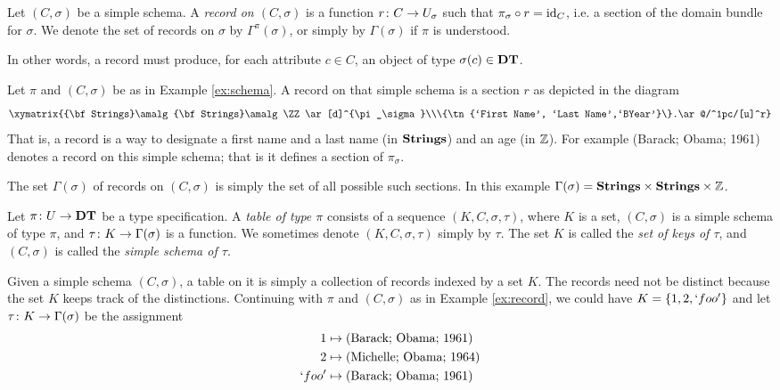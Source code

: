 \documentclass{amsart}
\def\DT{{\bf DT}}
\def\Strings{{\bf Strings}}
\begin{document}
\begin{definition}\label{def:records}

Let $(C,\sigma)$ be a simple schema.  A {\em record on $(C,\sigma)$} is a function $r\colon C\rightarrow U_\sigma$ such that $\pi_\sigma\circ r=\textnormal{id}_C$, i.e. a section of the domain bundle for $\sigma$.  We denote the set of records on $\sigma$ by $\Gamma^\pi(\sigma)$, or simply by $\Gamma(\sigma)$ if $\pi$ is understood.

\end{definition}

In other words, a record must produce, for each attribute $c\in C$, an object of type $\sigma(c)\in\DT$.  

\begin{example}\label{ex:record}

Let $\pi$ and $(C,\sigma)$ be as in Example \ref{ex:schema}.  A record on that simple schema is a section $r$ as depicted in the diagram $$\xymatrix{\Strings\amalg\Strings\amalg\ZZ\ar[d]^{\pi_\sigma}\\\{\tn{`First Name', `Last Name',`BYear'}\}.\ar@/^1pc/[u]^r}$$  That is, a record is a way to designate a first name and a last name (in $\Strings$) and an age (in ${\mathbb Z}$).  For example (Barack; Obama; 1961) denotes a record on this simple schema; that is it defines a section of $\pi_\sigma$.

The set $\Gamma(\sigma)$ of records on $(C,\sigma)$ is simply the set of all possible such sections.  In this example $\Gamma(\sigma)=\Strings\cross\Strings\cross\ZZ$.

\end{example}

\begin{definition}\label{def:tables}

Let $\pi\taking U\to\DT$ be a type specification.  A {\em table of type $\pi$} consists of a sequence $(K,C,\sigma,\tau)$, where $K$ is a set, $(C,\sigma)$ is a simple schema of type $\pi$,  and $\tau\colon K\rightarrow\Gamma(\sigma)$ is a function.  We sometimes denote $(K,C,\sigma,\tau)$ simply by $\tau$.  The set $K$ is called the {\em set of keys of $\tau$}, and $(C,\sigma)$ is called the {\em simple schema of $\tau$}.

\end{definition}

\begin{example}\label{ex:table}

Given a simple schema $(C,\sigma)$, a table on it is simply a collection of records indexed by a set $K$.  The records need not be distinct because the set $K$ keeps track of the distinctions.  Continuing with $\pi$ and $(C,\sigma)$ as in Example \ref{ex:record}, we could have $K=\{1,2,`foo'\}$ and let $\tau\colon K\rightarrow\Gamma(\sigma)$ be the assignment \begin{align*} 1&\mapsto \textnormal{(Barack; Obama; 1961)}\\2&\mapsto \textnormal{(Michelle; Obama; 1964)}\\ `foo'&\mapsto\textnormal{(Barack; Obama; 1961)}\end{align*}

\end{example}
\end{document}
